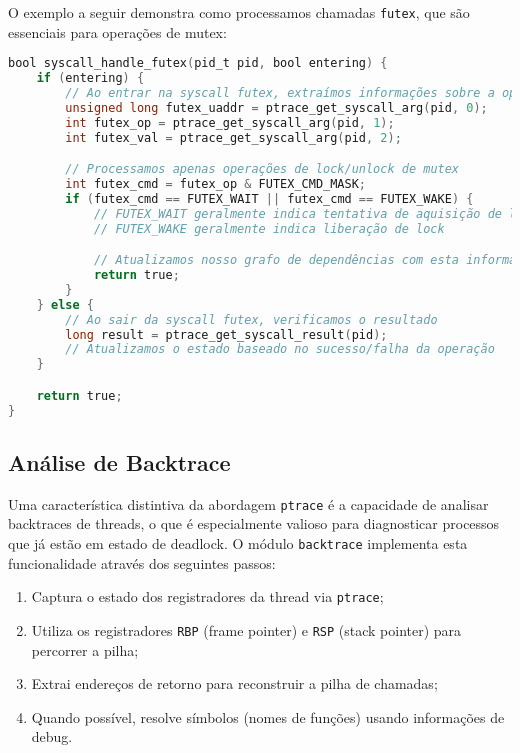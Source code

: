 O exemplo a seguir demonstra como processamos chamadas \texttt{futex}, que são essenciais para operações de mutex:

\begin{lstlisting}[language=C, caption={Processamento de chamadas futex para detecção de operações mutex}]
bool syscall_handle_futex(pid_t pid, bool entering) {
    if (entering) {
        // Ao entrar na syscall futex, extraímos informações sobre a operação
        unsigned long futex_uaddr = ptrace_get_syscall_arg(pid, 0);
        int futex_op = ptrace_get_syscall_arg(pid, 1);
        int futex_val = ptrace_get_syscall_arg(pid, 2);

        // Processamos apenas operações de lock/unlock de mutex
        int futex_cmd = futex_op & FUTEX_CMD_MASK;
        if (futex_cmd == FUTEX_WAIT || futex_cmd == FUTEX_WAKE) {
            // FUTEX_WAIT geralmente indica tentativa de aquisição de lock
            // FUTEX_WAKE geralmente indica liberação de lock

            // Atualizamos nosso grafo de dependências com esta informação
            return true;
        }
    } else {
        // Ao sair da syscall futex, verificamos o resultado
        long result = ptrace_get_syscall_result(pid);
        // Atualizamos o estado baseado no sucesso/falha da operação
    }

    return true;
}
\end{lstlisting}

\subsection{Análise de Backtrace}

Uma característica distintiva da abordagem \texttt{ptrace} é a capacidade de analisar backtraces de threads, o que é especialmente valioso para diagnosticar processos que já estão em estado de deadlock. O módulo \texttt{backtrace} implementa esta funcionalidade através dos seguintes passos:

\begin{enumerate}
    \item Captura o estado dos registradores da thread via \texttt{ptrace};
    \item Utiliza os registradores \texttt{RBP} (frame pointer) e \texttt{RSP} (stack pointer) para percorrer a pilha;
    \item Extrai endereços de retorno para reconstruir a pilha de chamadas;
    \item Quando possível, resolve símbolos (nomes de funções) usando informações de debug.
\end{enumerate}

